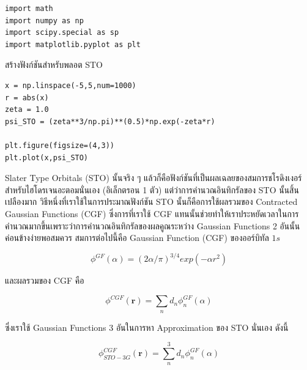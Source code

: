 \vspace{5pt}

\begin{lstlisting}[style=MyPython]
%matplotlib inline
import math
import numpy as np
import scipy.special as sp
import matplotlib.pyplot as plt
\end{lstlisting}

\vspace{5pt}

\noindent สร้างฟังก์ชันสำหรับพลอต STO

\vspace{5pt}

\begin{lstlisting}[style=MyPython]
x = np.linspace(-5,5,num=1000)
r = abs(x)
zeta = 1.0
psi_STO = (zeta**3/np.pi)**(0.5)*np.exp(-zeta*r)

plt.figure(figsize=(4,3))
plt.plot(x,psi_STO)
\end{lstlisting}

\vspace{5pt}

Slater Type Orbitals (STO) นั้นจริง ๆ แล้วก็คือฟังก์ชันที่เป็นผลเฉลยของสมการชโรดิงเงอร์สำหรับไฮโดรเจนอะตอมนั่นเอง (อิเล็กตรอน 1 ตัว)
แต่ว่าการคำนวณอินทิกรัลของ STO นั้นสิ้นเปลืองมาก วิธีหนึ่งที่เราใช้ในการประมาณฟังก์ชัน STO นั้นก็คือการใช้ผลรวมของ Contracted Gaussian
Functions (CGF) ซึ่งการที่เราใช้ CGF แทนนั้นช่วยทำให้เราประหยัดเวลาในการคำนวณมากขึ้นเพราะว่าการคำนวณอินทิกรัลของผลคูณระหว่าง
Gaussian Functions 2 อันนั้นค่อนข้างง่ายพอสมควร สมการต่อไปนี้คือ Gaussian Function (CGF) ของออร์บิทัล $1s$

\begin{equation}
  \phi^{GF}(\alpha)
  =
  (2\alpha/\pi)^{3/4}exp(-\alpha r^{2})
\end{equation}

\noindent และผลรวมของ CGF คือ

\begin{equation}
  \phi^{CGF}\left( \boldsymbol{r}\right)
  =
  \sum_n d_n\phi^{GF}_n(\alpha)
\end{equation}

\noindent ซึ่งเราใช้ Gaussian Functions 3 อันในการหา Approximation ของ STO นั่นเอง ดังนี้

\begin{equation}
  \phi^{CGF}_{STO-3G}\left( \boldsymbol{r}\right)
  =
  \sum^3_n d_n\phi^{GF}_n(\alpha)
\end{equation}

\vspace{5pt}

